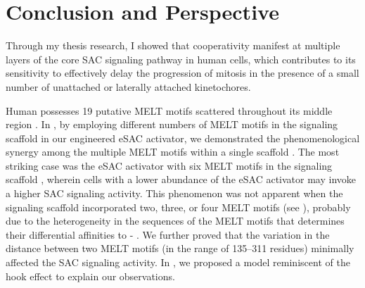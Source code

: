 \chapter{Conclusion and Perspective}
\label{chpt:conclusion}

Through my thesis research, I showed that cooperativity manifest at multiple layers of the core SAC signaling pathway in human cells, which contributes to its sensitivity to effectively delay the progression of mitosis in the presence of a small number of unattached or laterally attached kinetochores.

Human  possesses 19 putative MELT motifs scattered throughout its middle region \cite{MELTEvolution}. In , by employing different numbers of MELT motifs in the signaling scaffold in our engineered eSAC activator, we demonstrated the phenomenological synergy among the multiple MELT motifs within a single scaffold \cite{eSAC}. The most striking case was the eSAC activator with six MELT motifs in the signaling scaffold , wherein cells with a lower abundance of the eSAC activator may invoke a higher SAC signaling activity. This phenomenon was not apparent when the signaling scaffold incorporated two, three, or four MELT motifs (see ), probably due to the heterogeneity in the sequences of the MELT motifs that determines their differential affinities to - \cite{MELTActivity, eSAC}. We further proved that the variation in the distance between two MELT motifs (in the range of 135--311 residues) minimally affected the SAC signaling activity. In , we proposed a model reminiscent of the hook effect to explain our observations.

